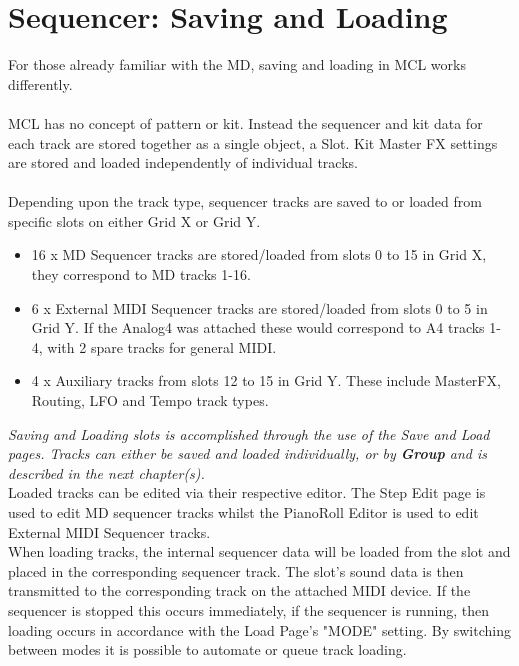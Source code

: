 \chapter{Sequencer: Saving and Loading}
For those already familiar with the MD, saving and loading in MCL works differently.\\\\
MCL has no concept of pattern or kit. Instead the sequencer and kit data for each track are stored together as a single object, a Slot. Kit Master FX settings are stored and loaded independently of individual tracks.
\\\\
Depending upon the track type, sequencer tracks are saved to or loaded from specific slots on either Grid X or Grid Y.

\begin{itemize}
    \item 16 x MD Sequencer tracks are stored/loaded from slots 0 to 15 in Grid X, they correspond to MD tracks 1-16.
    \item 6 x External MIDI Sequencer tracks are stored/loaded from slots 0 to 5 in Grid Y. If the Analog4 was attached these would correspond to A4 tracks 1- 4, with 2 spare tracks for general MIDI.
    \item 4 x Auxiliary tracks from slots 12 to 15 in Grid Y. These include MasterFX, Routing, LFO and Tempo track types.
\end{itemize}

\textit{Saving and Loading slots is accomplished through the use of the Save and Load pages.  Tracks can either be saved and loaded individually, or by \textbf{Group} and is described in the next chapter(s).}\\

Loaded tracks can be edited via their respective editor. The Step Edit page is used to edit MD sequencer tracks whilst the PianoRoll Editor is used to edit External MIDI Sequencer tracks.\\

When loading tracks, the internal sequencer data will be loaded from the slot and placed in the corresponding sequencer track. The slot's sound data is then transmitted to the corresponding track on the attached MIDI device. If the sequencer is stopped this occurs immediately, if the sequencer is running, then loading occurs in accordance with the Load Page's "MODE" setting. By switching between modes it is possible to automate or queue track loading.
\\

